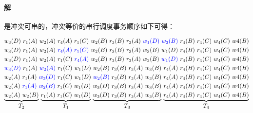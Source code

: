 \documentclass{article}
\newcommand{\tikzmark}[3][]
  {\tikz[remember picture, baseline, every node/.style={inner sep=0,outer sep=0}]
    \node [anchor = base, #1](#2) {#3};}
\begin{document}
\paragraph{解}
是冲突可串的，冲突等价的串行调度事务顺序如下可得：
\begin{large}
    \begin{align*}
        w_3(D)\ r_1(A)\ w_2(A)\ r_4(A)\ r_1(C)\ w_2(B)\ r_3(B)\ r_3(A)\ \tikzmark[blue]{Anchor2-a}{$w_1(D)$}\ \tikzmark[blue]{Anchor2-b}{$w_3(B)$}\ r_4(B)\ r_4(C)\ w_4(C)\ w4(B) \\
        w_3(D)\ r_1(A)\ w_2(A)\ \tikzmark[blue]{Anchor3-a}{$r_4(A)$}\ \tikzmark[blue]{Anchor3-b}{$r_1(C)$}\ w_2(B)\ r_3(B)\ r_3(A)\ w_3(B)\ w_1(D)\ r_4(B)\ r_4(C)\ w_4(C)\ w4(B) \\
        w_3(D)\ r_1(A)\ w_2(A)\ r_1(C)\ \tikzmark[blue]{Anchor4-a}{$r_4(A)$}\ w_2(B)\ r_3(B)\ r_3(A)\ w_3(B)\ \tikzmark[blue]{Anchor4-b}{$w_1(D)$}\ r_4(B)\ r_4(C)\ w_4(C)\ w4(B) \\
        \tikzmark[blue]{Anchor5-a}{$w_3(D)$}\ r_1(A)\ \tikzmark[blue]{Anchor5-b}{$w_2(A)$}\ r_1(C)\ w_1(D)\ w_2(B)\ r_3(B)\ r_3(A)\ w_3(B)\ r_4(A)\ r_4(B)\ r_4(C)\ w_4(C)\ w4(B) \\
        w_2(A)\ r_1(A)\ \tikzmark[blue]{Anchor6-a}{$w_3(D)$}\ r_1(C)\ w_1(D)\ \tikzmark[blue]{Anchor6-b}{$w_2(B)$}\ r_3(B)\ r_3(A)\ w_3(B)\ r_4(A)\ r_4(B)\ r_4(C)\ w_4(C)\ w4(B) \\
        w_2(A)\ \tikzmark[blue]{Anchor7-a}{$r_1(A)$}\ \tikzmark[blue]{Anchor7-b}{$w_2(B)$}\ r_1(C)\ w_1(D)\ w_3(D)\ r_3(B)\ r_3(A)\ w_3(B)\ r_4(A)\ r_4(B)\ r_4(C)\ w_4(C)\ w4(B) \\
        \underbrace{w_2(A)\ w_2(B)}_{\displaystyle T_2}\,\underbrace{r_1(A)\ r_1(C)\ w_1(D)}_{\displaystyle T_1}\,\underbrace{w_3(D)\ r_3(B)\ r_3(A)\ w_3(B)}_{\displaystyle T_3}\,\underbrace{r_4(A)\ r_4(B)\ r_4(C)\ w_4(C)\ w4(B)}_{\displaystyle T_4}
    \end{align*}
\end{large}
\end{document}
